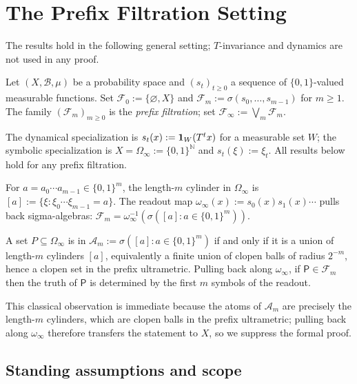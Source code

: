\section{The Prefix Filtration Setting}
\label{sec:prefix}

The results hold in the following general setting; $T$-invariance and dynamics
are not used in any proof.

\begin{definition}
\label{def:prefix-filtration}
Let $(X,\mathcal{B},\mu)$ be a probability space and $(s_t)_{t\ge 0}$ a
sequence of $\{0,1\}$-valued measurable functions.  Set $\mathcal{F}_0:=\{\varnothing,X\}$
and $\mathcal{F}_m:=\sigma(s_0,\ldots,s_{m-1})$ for $m\ge 1$.  The family
$(\mathcal{F}_m)_{m\ge 0}$ is the \emph{prefix filtration}; set
$\mathcal{F}_\infty:=\bigvee_m\mathcal{F}_m$.
\end{definition}

The dynamical specialization is $s_t(x):=\mathbf{1}_W(T^tx)$ for a measurable set
$W$; the symbolic specialization is $X=\Omega_\infty:=\{0,1\}^{\mathbb{N}}$
and $s_t(\xi):=\xi_t$.  All results below hold for any prefix filtration.

For $a=a_0\cdots a_{m-1}\in\{0,1\}^m$, the length-$m$ cylinder in
$\Omega_\infty$ is $[a]:=\{\xi:\xi_0\cdots\xi_{m-1}=a\}$.  The readout map
$\omega_\infty(x):=s_0(x)s_1(x)\cdots$ pulls back sigma-algebras:
$\mathcal{F}_m=\omega_\infty^{-1}(\sigma([a]:a\in\{0,1\}^m))$.

\begin{proposition}
\label{prop:decidable-clopen}
A set $P\subseteq\Omega_\infty$ is in $\mathcal{A}_m:=\sigma([a]:a\in\{0,1\}^m)$
if and only if it is a union of length-$m$ cylinders $[a]$, equivalently a
finite union of clopen balls of radius $2^{-m}$, hence a clopen set in the
prefix ultrametric.  Pulling back along
$\omega_\infty$, if $\mathsf{P}\in\mathcal{F}_m$ then the truth of
$\mathsf{P}$ is determined by the first $m$ symbols of the readout.
\end{proposition}

This classical observation is immediate because the atoms of
$\mathcal{A}_m$ are precisely the length-$m$ cylinders, which are clopen balls
in the prefix ultrametric; pulling back along $\omega_\infty$ therefore
transfers the statement to $X$, so we suppress the formal proof.

\subsection{Standing assumptions and scope}
\label{sub:standing}

